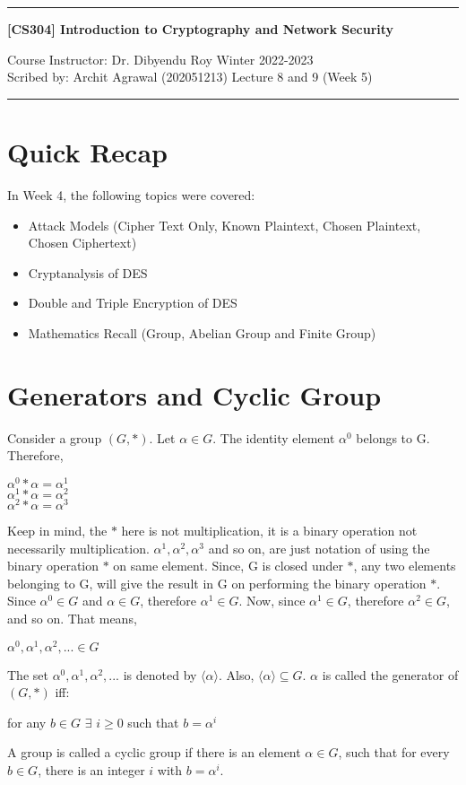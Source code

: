 \documentclass[11pt]{article}
\begin{document}
\noindent
\rule{\textwidth}{1pt}
\begin{center}
{\bf [CS304] Introduction to Cryptography and Network Security}
\end{center}
Course Instructor: Dr. Dibyendu Roy \hfill Winter 2022-2023\\
Scribed by: Archit Agrawal (202051213) \hfill Lecture 8 and 9 (Week 5)
\\
\rule{\textwidth}{1pt}

\section{Quick Recap}
In Week 4, the following topics were covered:
\begin{itemize}
    \item Attack Models (Cipher Text Only, Known Plaintext, Chosen Plaintext, Chosen Ciphertext) 
    \item Cryptanalysis of DES
    \item Double and Triple Encryption of DES
    \item Mathematics Recall (Group, Abelian Group and Finite Group)
\end{itemize}

\section{Generators and Cyclic Group}
Consider a group $(G, *)$. Let $\alpha \in G$. The identity element $\alpha^0$ belongs to G. Therefore,
\begin{center}
    $\alpha^0 * \alpha = \alpha^1$\\
    \vspace{1mm}
    $\alpha^1 * \alpha = \alpha^2$\\
    \vspace{1mm}
    $\alpha^2 * \alpha = \alpha^3$\\
\end{center}
Keep in mind, the $*$ here is not multiplication, it is a binary operation not necessarily multiplication. $\alpha^1, \alpha^2, \alpha^3$ and so on, are just notation of using the binary operation $*$ on same element. Since, G is closed under $*$, any two elements belonging to G, will give the result in G on performing the binary operation $*$. Since $\alpha^0 \in G$ and $\alpha \in G$, therefore $\alpha^1 \in G$. Now, since $\alpha^1 \in G$, therefore $\alpha^2 \in G$, and so on. That means,
\begin{center}
    $\alpha^0, \alpha^1, \alpha^2, ... \in G$
\end{center}
The set $\alpha^0, \alpha^1, \alpha^2, ...$ is denoted by $\langle \alpha \rangle$. Also, $\langle \alpha \rangle \subseteq G$. $\alpha$ is called the generator of $(G, *)$ iff:
\begin{center}
    for any $b \in G$ $\exists$ $i \geq 0$ such that $b = \alpha^i$
\end{center}
A group is called a cyclic group if there is an element $\alpha \in G$, such that for every $b \in G$, there is an integer $i$ with $b = \alpha^i$.
\end{document}
